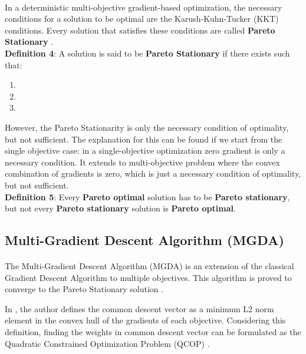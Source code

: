 \documentclass[letterpaper]{article}
\begin{document}
\paragraph{}

In a deterministic multi-objective gradient-based optimization, the necessary conditions for a solution to be optimal are the Karush-Kuhn-Tucker (KKT) conditions. Every solution that satisfies these conditions are called \textbf{Pareto Stationary} \cite{desideri:hal-00768935}.\\
\newline
\textbf{Definition 4}: A solution  is said to be \textbf{Pareto Stationary} if there exists  such that:
\begin{enumerate}
    \item 
    \item 
    \item 
\end{enumerate}
However, the Pareto Stationarity is only the necessary condition of optimality, but not sufficient. The explanation for this can be found if we start from the single objective case: in a single-objective optimization zero gradient is only a necessary condition. It extends to multi-objective problem where the convex combination of gradients is zero, which is just a necessary condition of optimality, but not sufficient.
\\
\newline
\textbf{Definition 5}: Every \textbf{Pareto optimal} solution has to be \textbf{Pareto stationary}, but not every \textbf{Pareto stationary} solution is \textbf{Pareto optimal}.

\subsection{Multi-Gradient Descent Algorithm (MGDA)}
\paragraph{}

The Multi-Gradient Descent Algorithm (MGDA) is an extension of the classical Gradient Descent Algorithm to multiple objectives. This algorithm is proved to converge to the Pareto Stationary solution \cite{desideri:hal-00768935}.

In \cite{desideri:hal-00768935}, the author defines the common descent vector as a minimum L2 norm element in the convex hull of the gradients of each objective. Considering this definition, finding the weights in common descent vector can be formulated as the Quadratic Constrained Optimization Problem (QCOP) \cite{desideri:hal-00768935}.
\end{document}
